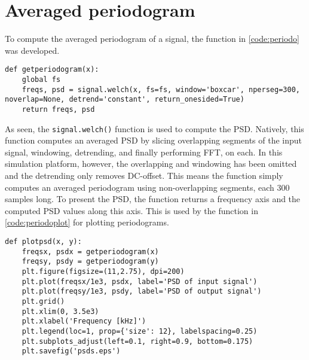 

\section{Averaged periodogram}
To compute the averaged periodogram of a signal, the function in \cref{code:periodo} was developed.

\lstset{language=python,caption=Function for computing averaged periodogram,label=code:periodo}
\begin{lstlisting}
def getperiodogram(x):
    global fs
    freqs, psd = signal.welch(x, fs=fs, window='boxcar', nperseg=300, noverlap=None, detrend='constant', return_onesided=True)
    return freqs, psd
\end{lstlisting}

As seen, the \texttt{signal.welch()} function is used to compute the PSD. Natively, this function computes an averaged PSD by slicing overlapping segments of the input signal, windowing, detrending, and finally performing FFT, on each. In this simulation platform, however, the overlapping and windowing has been omitted and the detrending only removes DC-offset. This means the function simply computes an averaged periodogram using non-overlapping segments, each 300 samples long. To present the PSD, the function returns a frequency axis and the computed PSD values along this axis. This is used by the function in \cref{code:periodoplot} for plotting periodograms.

\lstset{language=python,caption=Function for plotting periodogram of in- and output signals,label=code:periodoplot}
\begin{lstlisting}
def plotpsd(x, y):
    freqsx, psdx = getperiodogram(x)
    freqsy, psdy = getperiodogram(y)
    plt.figure(figsize=(11,2.75), dpi=200)  
    plt.plot(freqsx/1e3, psdx, label='PSD of input signal')
    plt.plot(freqsy/1e3, psdy, label='PSD of output signal')
    plt.grid()
    plt.xlim(0, 3.5e3)
    plt.xlabel('Frequency [kHz]')
    plt.legend(loc=1, prop={'size': 12}, labelspacing=0.25)
    plt.subplots_adjust(left=0.1, right=0.9, bottom=0.175)
    plt.savefig('psds.eps') 
\end{lstlisting}

